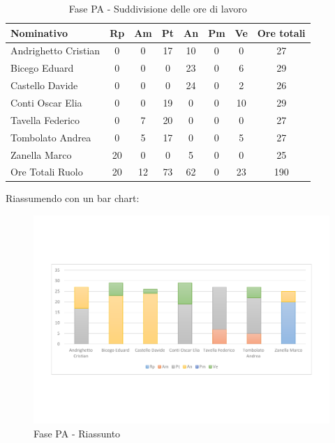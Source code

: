 \documentclass[../PianoProgetto.tex]{subfiles}
\begin{document}
	\begin{table}[h]
		\centering
	
		\begin{tabularx}{\textwidth}{l  * {6}{C}  c}
			\toprule
			\textbf{Nominativo} & \textbf{Rp} & \textbf{Am} & \textbf{Pt} 
						& \textbf{An} & \textbf{Pm} & \textbf{Ve} & \textbf{Ore totali} \\
			\midrule
			Andrighetto Cristian & 0 & 0 &	17 & 10 & 0 & 0 & 27 \\
			Bicego Eduard & 0 & 0 & 0 & 23 & 0 & 6 & 29 \\
			Castello Davide & 0 & 0 & 0 & 24 & 0 & 2 & 26 \\
			Conti Oscar Elia & 0 & 0 &	19 & 0 & 0 & 10 & 29 \\
			Tavella Federico &	0 & 7 & 20 & 0 & 0 & 0 & 27 \\
			Tombolato Andrea & 0 & 5 &	17 & 0 & 0 & 5 & 27 \\
			Zanella Marco & 20 & 0 & 0 & 5 & 0 & 0 & 25 \\
			\midrule			
			Ore Totali Ruolo & 20 & 12 & 73 & 62 & 0 & 23 & 190 \\
			\bottomrule
			
		\end{tabularx}
		\caption{Fase PA - Suddivisione delle ore di lavoro}
		\label{tab:fasePA_ore}
	\end{table}
\vfill	
	Riassumendo con un bar chart:	
	
	\begin{figure}[!h]
		\centering
		\includegraphics[width=\textwidth , trim=2cm 5cm 2cm 5cm]{grafici/PA/PA-ore-persona}
			\caption{Fase PA - Riassunto}
		\label{fig:BarChart-fasePA_ore}
	\end{figure}
\vfill	
\newpage
	
\end{document}

